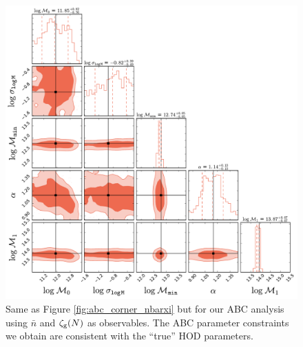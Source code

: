 \begin{figure}
\includegraphics[width=1.\textwidth]{figs/abc/paper_ABCcorner_nbargmf.pdf}
\caption{\label{fig:abc_corner_nbargmf}Same as Figure \ref{fig:abc_corner_nbarxi} but for our ABC analysis using $\bar{n}$ and $\mathcal{\zeta}_{\rm g}(N)$ as observables. The ABC parameter constraints we obtain are
consistent with the ``true'' HOD parameters.}
\end{figure}

